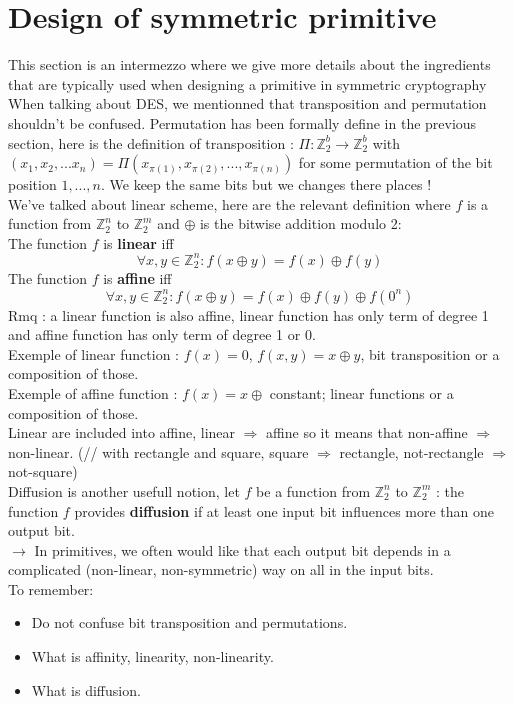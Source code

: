 \documentclass[11pt,a4paper]{report}
\begin{document}
\section{Design of symmetric primitive}
This section is an intermezzo where we give more details about the ingredients that are typically used when designing a primitive in symmetric cryptography\\

When talking about DES, we mentionned that transposition and permutation shouldn't be confused. Permutation has been formally define in the previous section, here is the definition of transposition : $\Pi : \mathbb{Z}_2^b \rightarrow \mathbb{Z}_2^b$ with $(x_1,x_2,...x_n) = \Pi(x_{\pi(1)},x_{\pi(2)},...,x_{\pi(n)})$ for some permutation of the bit position $1,...,n$. We keep the same bits but we changes there places !\\

We've talked about linear scheme, here are the relevant definition where $f$ is a function from $\mathbb{Z}_2^n$ to $\mathbb{Z}_2^m$ and $\oplus$ is the bitwise addition modulo 2:\\
The function $f$ is \textbf{linear} iff
$$\forall x,y \in \mathbb{Z}_2^n : f(x\oplus y) = f(x) \oplus f(y)$$
The function $f$ is \textbf{affine} iff
$$\forall x,y \in \mathbb{Z}_2^n : f(x\oplus y) = f(x) \oplus f(y) \oplus f(0^n)$$
Rmq : a linear function is also affine, linear function has only term of degree 1 and affine function has only term of degree 1 or 0.\\
Exemple of linear function : $f(x) = 0$, $f(x,y) = x \oplus y$, bit transposition or a composition of those.\\
Exemple of affine function : $f(x) = x \oplus$ constant; linear functions or a composition of those.\\
Linear are included into affine, linear $\Rightarrow$ affine so it means that non-affine $\Rightarrow$ non-linear. (// with rectangle and square, square $\Rightarrow$ rectangle, not-rectangle $\Rightarrow$ not-square)\\

Diffusion is another usefull notion, let $f$ be a function from $\mathbb{Z}_2^n$ to $\mathbb{Z}_2^m$ : the function $f$ provides \textbf{diffusion} if at least one input bit influences more than one output bit.\\

$\longrightarrow$ In primitives, we often would like that each output bit depends in a complicated (non-linear, non-symmetric) way on all in the input bits.\\
To remember:
\begin{itemize}
\item Do not confuse bit transposition and permutations.
\item What is affinity, linearity, non-linearity.
\item What is diffusion.
\end{itemize}
\end{document}
